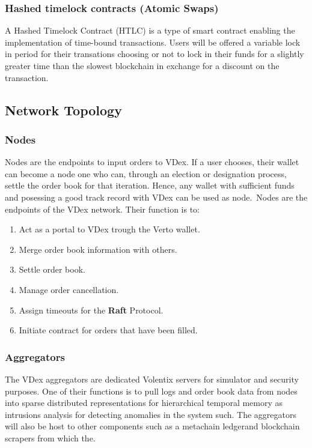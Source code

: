 \documentclass[]{article}
\begin{document}
	\subsubsection{Hashed timelock contracts (Atomic Swaps)}
	A Hashed Timelock Contract (HTLC)\cite{22} is a type of smart contract enabling the implementation of time-bound transactions.
	Users will be offered a variable lock in period for their transations choosing or not
	to lock in their funds for a slightly greater time than the slowest blockchain in exchange for a discount on the transaction.
	
	\subsection{Network Topology}
	\subsubsection{Nodes}
	Nodes are the endpoints to input orders to VDex. If a user chooses, their wallet can become a node one who can, through an election or designation process, settle the order book for that iteration.   
	Hence, any wallet with sufficient funds and posessing a good track record with VDex can be used as node.\
	Nodes are the endpoints of the VDex network.
	Their function is to:\
	\begin{enumerate}
		\item Act as a portal to VDex trough the Verto wallet.
		\item Merge order book information with others.
		\item Settle order book.\
		\item Manage order cancellation.\
		\item Assign timeouts for the \textbf{Raft} Protocol.\
		\item Initiate contract for orders that have been filled.
	\end{enumerate}
	
	\subsubsection{Aggregators}
	
	The VDex aggregators are dedicated Volentix servers for simulator and security purposes. 
	One of their functions is to pull logs and order book data from nodes into sparse distributed representations for hierarchical temporal memory as intrusions \cite{24} analysis for detecting anomalies in the system such. The aggregators will also be host to other components such as a metachain  ledger\cite{20}and blockchain scrapers from which the.
	 
\end{document}
